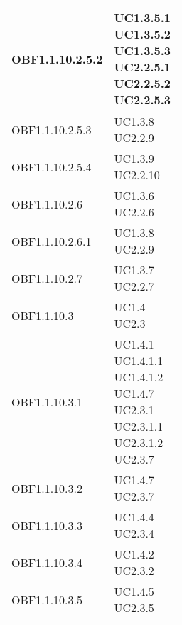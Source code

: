 \documentclass{scalatekids-article}
\begin{document}
\begin{longtable}[H]{|p{5.5cm}|p{5.5cm}|}
  \hline
  OBF1.1.10.2.5.2 & \multiLineCell[t]{UC1.3.5.1\\UC1.3.5.2\\UC1.3.5.3\\UC2.2.5.1\\UC2.2.5.2\\UC2.2.5.3\\}\\
  \hline
  OBF1.1.10.2.5.3 & \multiLineCell[t]{UC1.3.8\\UC2.2.9\\}\\
  \hline
  OBF1.1.10.2.5.4 & \multiLineCell[t]{UC1.3.9\\UC2.2.10\\}\\
  \hline
  OBF1.1.10.2.6 & \multiLineCell[t]{UC1.3.6\\UC2.2.6\\}\\
  \hline
  OBF1.1.10.2.6.1 & \multiLineCell[t]{UC1.3.8\\UC2.2.9\\}\\
  \hline
  OBF1.1.10.2.7 & \multiLineCell[t]{UC1.3.7\\UC2.2.7\\}\\
  \hline
  OBF1.1.10.3 & \multiLineCell[t]{UC1.4\\UC2.3\\}\\
  \hline
  OBF1.1.10.3.1 & \multiLineCell[t]{UC1.4.1\\UC1.4.1.1\\UC1.4.1.2\\UC1.4.7\\UC2.3.1\\UC2.3.1.1\\UC2.3.1.2\\UC2.3.7\\}\\
  \hline
  OBF1.1.10.3.2 & \multiLineCell[t]{UC1.4.7\\UC2.3.7\\}\\
  \hline
  OBF1.1.10.3.3 & \multiLineCell[t]{UC1.4.4\\UC2.3.4\\}\\
  \hline
  OBF1.1.10.3.4 & \multiLineCell[t]{UC1.4.2\\UC2.3.2\\}\\
  \hline
  OBF1.1.10.3.5 & \multiLineCell[t]{UC1.4.5\\UC2.3.5\\}\\

\end{longtable}
\end{document}
